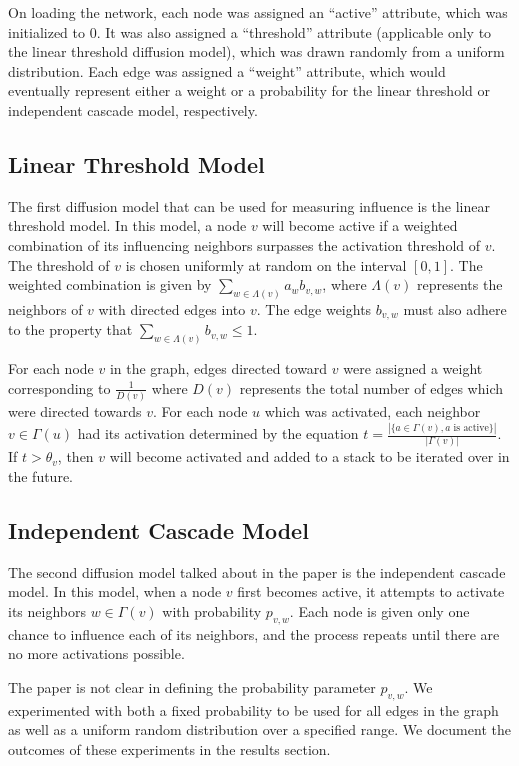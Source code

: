 \documentclass{article}
\begin{document}
    On loading the network, each node was assigned an ``active'' attribute, which was initialized to 0.  It was also assigned a ``threshold'' attribute (applicable only to the linear threshold diffusion model), which was drawn randomly from a uniform distribution.  Each edge was assigned a ``weight'' attribute, which would eventually represent either a weight or a probability for the linear threshold or independent cascade model, respectively.

  \subsection{Linear Threshold Model}
    The first diffusion model that can be used for measuring influence is the linear threshold model.  In this model, a node $v$ will become active if a weighted combination of its influencing neighbors surpasses the activation threshold of $v$.  The threshold of $v$ is chosen uniformly at random on the interval $[0, 1]$.  The weighted combination is given by $\sum_{w \in \Lambda(v)} a_w b_{v,w}$, where $\Lambda(v)$ represents the neighbors of $v$ with directed edges into $v$.  The edge weights $b_{v,w}$ must also adhere to the property that $\sum_{w \in \Lambda(v)} b_{v,w} \leq 1$.

    For each node $v$ in the graph, edges directed toward $v$ were assigned a weight corresponding to $\frac{1}{D(v)}$ where $D(v)$ represents the total number of edges which were directed towards $v$. For each node $u$ which was activated, each neighbor $v \in \Gamma(u)$ had its activation determined by the equation $t = \frac{|\{a \in \Gamma(v), a \textrm{ is active}\}|}{|\Gamma(v)|}$. If $t > \theta_v$, then $v$ will become activated and added to a stack to be iterated over in the future.

  \subsection{Independent Cascade Model}
    The second diffusion model talked about in the paper is the independent cascade model. In this model, when a node $v$ first becomes active, it attempts to activate its neighbors $w \in \Gamma(v)$ with probability $p_{v, w}$. Each node is given only one chance to influence each of its neighbors, and the process repeats until there are no more activations possible.

    The paper is not clear in defining the probability parameter $p_{v, w}$. We experimented with both a fixed probability to be used for all edges in the graph as well as a uniform random distribution over a specified range. We document the outcomes of these experiments in the results section.
\end{document}
